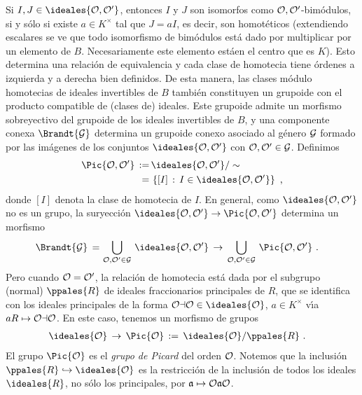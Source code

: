 Si $I,J\in\ideales{\cal{O},\cal{O}'}$, entonces $I$ y $J$ son isomorfos
como $\cal{O},\cal{O}'$-bim\'{o}dulos, si y s\'{o}lo si existe
$a\in K^{\times}$ tal que $J=aI$, es decir, son homot\'{e}ticos
(extendiendo escalares %
se ve que todo isomorfismo de bim\'{o}dulos est\'{a} dado por multiplicar
por un elemento de $B$. Necesariamente este elemento est\'{a}en el centro que
es $K$). Esto determina una relaci\'{o}n de equivalencia y cada clase de
homotecia tiene \'{o}rdenes a izquierda y a derecha bien definidos.
De esta manera, las clases m\'{o}dulo homotecias de ideales invertibles de
$B$ tambi\'{e}n constituyen un grupoide con el producto compatible de
(clases de) ideales. Este grupoide admite un morfismo sobreyectivo del
grupoide de los ideales invertibles de $B$, y una componente conexa
$\Brandt{\cal{G}}$ determina un grupoide conexo asociado al g\'{e}nero
$\cal{G}$ formado por las im\'{a}genes de los conjuntos
$\ideales{\cal{O},\cal{O}'}$ con $\cal{O},\cal{O}'\in\cal{G}$.
Definimos
\begin{align*}
 \Pic{\cal{O},\cal{O}'} \,:=\, & \ideales{\cal{O},\cal{O}'}/\sim \\
	\,=\, &
	\left\lbrace [I]\,:\,I\in\ideales{\cal{O},\cal{O}'}\right\rbrace
	\text{ ,}
\end{align*}
%
donde $[I]$ denota la clase de homotecia de $I$. En general, como
$\ideales{\cal{O},\cal{O}'}$ no es un grupo, la suryecci\'{o}n
$\ideales{\cal{O},\cal{O}'}\rightarrow\Pic{\cal{O},\cal{O}'}$ determina un
morfismo
\begin{align*}
	\Brandt{\cal{G}}\,=\, & \bigcup_{\cal{O},\cal{O}'\in\cal{G}}\,
	\ideales{\cal{O},\cal{O}'}
	\,\rightarrow\,\bigcup_{\cal{O},\cal{O}'\in\cal{G}}\,
	\Pic{\cal{O},\cal{O}'}
	\text{ .}
\end{align*}
%
Pero cuando $\cal{O}=\cal{O}'$, la relaci\'{o}n de homotecia est\'{a}
dada por el subgrupo (normal) $\ppales{R}$ de ideales fraccionarios
principales de $R$, que se identifica con los ideales principales de la
forma $\cal{O}a\cal{O}\in\ideales{\cal{O}}$, $a\in K^{\times}$ v\'{\i}a
$aR\mapsto\cal{O}a\cal{O}$. En este caso, tenemos un morfismo de grupos
\begin{align*}
 \ideales{\cal{O}} & \,\rightarrow\,\Pic{\cal{O}}\,:=\,
	\ideales{\cal{O}}/\ppales{R}
	\text{ .}
\end{align*}
%
El grupo $\Pic{\cal{O}}$ es el \emph{grupo de Picard} del orden $\cal{O}$.
Notemos que la inclusi\'{o}n $\ppales{R}\hookrightarrow\ideales{\cal{O}}$
es la restricci\'{o}n de la inclusi\'{o}n de todos los ideales $\ideales{R}$,
no s\'{o}lo los principales, por $\frak{a}\mapsto\cal{O}\frak{a}\cal{O}$.

